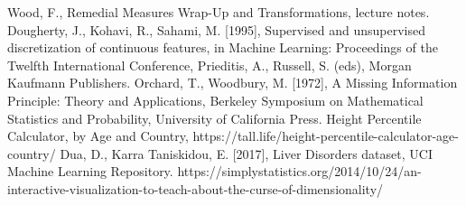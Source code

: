 \begin{thebibliography}{99}
Wood, F., Remedial Measures Wrap-Up and Transformations, lecture notes. 
Dougherty, J., Kohavi, R., Sahami, M. [1995], Supervised and unsupervised discretization of continuous features, in Machine Learning: Proceedings of the Twelfth International Conference, Prieditis, A., Russell, S. (eds), Morgan Kaufmann Publishers. 
Orchard, T., Woodbury, M. [1972], A Missing Information Principle: Theory and Applications, Berkeley Symposium on Mathematical Statistics and Probability, University of California Press.  
Height Percentile Calculator, by Age and Country, https://tall.life/height-percentile-calculator-age-country/ 
 Dua, D., Karra Taniskidou, E. [2017], Liver Disorders dataset, UCI Machine Learning Repository.
 https://simplystatistics.org/2014/10/24/an-interactive-visualization-to-teach-about-the-curse-of-dimensionality/ 
\end{thebibliography}
%
